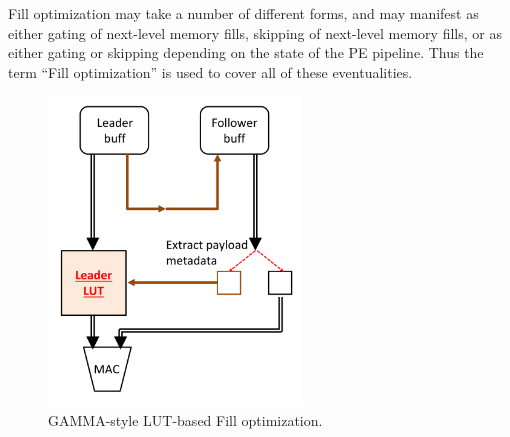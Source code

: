 Fill optimization may take a number of different forms, and may manifest as either gating of next-level memory fills\cite{eyerissv2}, skipping of next-level memory fills\cite{gamma}\cite{eyerissv2}, or as either gating or skipping depending on the state of the PE pipeline\cite{eyerissv2}. Thus the term ``Fill optimization'' is used to cover all of these eventualities. 

\begin{figure}[ht]
    \centering
    \includegraphics[width=0.6\textwidth]{figures/leader_lut.pdf}
    \caption{GAMMA\cite{gamma}-style LUT-based Fill optimization.}
    \label{fig:leader_lut}
\end{figure}

